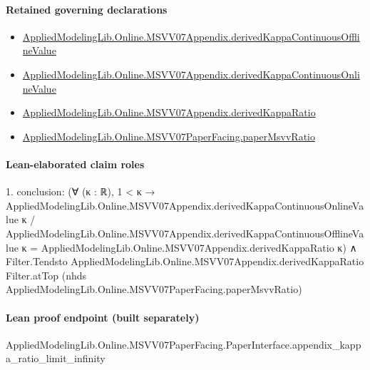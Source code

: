 \documentclass[10pt]{article}
\begin{document}
\paragraph{Retained governing declarations}
\begin{itemize}\raggedright
\item \hyperlink{governing-declaration-0510874bec2af784}{Applied\allowbreak{}Modeling\allowbreak{}Lib.\allowbreak{}Online.\allowbreak{}MSVV07\allowbreak{}Appendix.\allowbreak{}derived\allowbreak{}Kappa\allowbreak{}Continuous\allowbreak{}Offline\allowbreak{}Value}
\item \hyperlink{governing-declaration-c85b36feb7782e32}{Applied\allowbreak{}Modeling\allowbreak{}Lib.\allowbreak{}Online.\allowbreak{}MSVV07\allowbreak{}Appendix.\allowbreak{}derived\allowbreak{}Kappa\allowbreak{}Continuous\allowbreak{}Online\allowbreak{}Value}
\item \hyperlink{governing-declaration-95a6e05cf6f7d278}{Applied\allowbreak{}Modeling\allowbreak{}Lib.\allowbreak{}Online.\allowbreak{}MSVV07\allowbreak{}Appendix.\allowbreak{}derived\allowbreak{}Kappa\allowbreak{}Ratio}
\item \hyperlink{governing-declaration-11865634591d1a39}{Applied\allowbreak{}Modeling\allowbreak{}Lib.\allowbreak{}Online.\allowbreak{}MSVV07\allowbreak{}Paper\allowbreak{}Facing.\allowbreak{}paper\allowbreak{}Msvv\allowbreak{}Ratio}
\end{itemize}
\paragraph{Lean-elaborated claim roles}\begin{ReviewVerbatim}
1. conclusion: (∀ (κ : ℝ),
    1 < κ →
      AppliedModelingLib.Online.MSVV07Appendix.derivedKappaContinuousOnlineValue κ /
          AppliedModelingLib.Online.MSVV07Appendix.derivedKappaContinuousOfflineValue κ =
        AppliedModelingLib.Online.MSVV07Appendix.derivedKappaRatio κ) ∧
  Filter.Tendsto AppliedModelingLib.Online.MSVV07Appendix.derivedKappaRatio Filter.atTop
    (nhds AppliedModelingLib.Online.MSVV07PaperFacing.paperMsvvRatio)
\end{ReviewVerbatim}

\paragraph{Lean proof endpoint (built separately)}\begin{ReviewVerbatim}
AppliedModelingLib.Online.MSVV07PaperFacing.PaperInterface.appendix_kappa_ratio_limit_infinity
\end{ReviewVerbatim}
\end{document}
